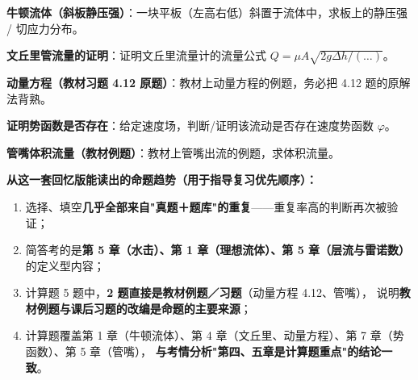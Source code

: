 \begin{ti}
  \item \textbf{牛顿流体（斜板静压强）}：一块平板（左高右低）斜置于流体中，求板上的静压强 / 切应力分布。
  \item \textbf{文丘里管流量的证明}：证明文丘里流量计的流量公式 $Q=\mu A\sqrt{2g\Delta h/(\ldots)}$。
  \item \textbf{动量方程（教材习题 4.12 原题）}：教材上动量方程的例题，务必把 4.12 题的原解法背熟。
  \item \textbf{证明势函数是否存在}：给定速度场，判断/证明该流动是否存在速度势函数 $\varphi$。
  \item \textbf{管嘴体积流量（教材例题）}：教材上管嘴出流的例题，求体积流量。
\end{ti}

\vspace{4mm}
\begin{jielun}
\textbf{从这一套回忆版能读出的命题趋势（用于指导复习优先顺序）：}
\begin{enumerate}
  \item 选择、填空\textbf{几乎全部来自"真题＋题库"的重复}——重复率高的判断再次被验证；
  \item 简答考的是\textbf{第 5 章（水击）、第 1 章（理想流体）、第 5 章（层流与雷诺数）}的定义型内容；
  \item 计算题 5 题中，\textbf{2 题直接是教材例题／习题}（动量方程 4.12、管嘴），
        说明\textbf{教材例题与课后习题的改编是命题的主要来源}；
  \item 计算题覆盖第 1 章（牛顿流体）、第 4 章（文丘里、动量方程）、第 7 章（势函数）、第 5 章（管嘴），
        \textbf{与考情分析"第四、五章是计算题重点"的结论一致}。
\end{enumerate}
\end{jielun}
